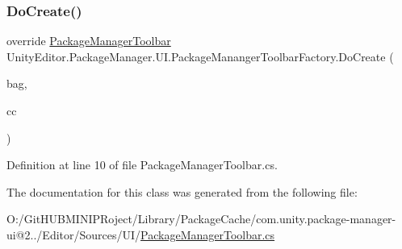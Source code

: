 \subsubsection{\texorpdfstring{DoCreate()}{DoCreate()}}
{\footnotesize\ttfamily override \mbox{\hyperlink{class_unity_editor_1_1_package_manager_1_1_u_i_1_1_package_manager_toolbar}{Package\+Manager\+Toolbar}} Unity\+Editor.\+Package\+Manager.\+U\+I.\+Package\+Mananger\+Toolbar\+Factory.\+Do\+Create (\begin{DoxyParamCaption}\item[{I\+Uxml\+Attributes}]{bag,  }\item[{Creation\+Context}]{cc }\end{DoxyParamCaption})\hspace{0.3cm}{\ttfamily [protected]}}



Definition at line 10 of file Package\+Manager\+Toolbar.\+cs.



The documentation for this class was generated from the following file\+:\begin{DoxyCompactItemize}
\item 
O\+:/\+Git\+H\+U\+B\+M\+I\+N\+I\+P\+Roject/\+Library/\+Package\+Cache/com.\+unity.\+package-\/manager-\/ui@2../\+Editor/\+Sources/\+U\+I/\mbox{\hyperlink{_package_manager_toolbar_8cs}{Package\+Manager\+Toolbar.\+cs}}\end{DoxyCompactItemize}
